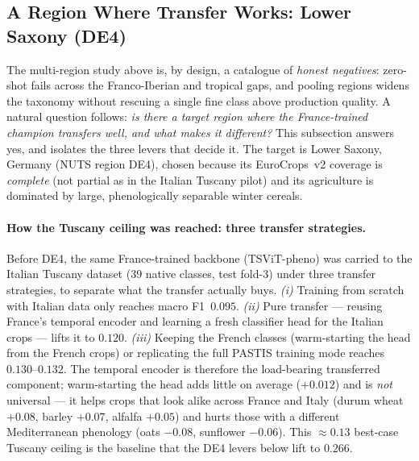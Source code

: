 
\subsection{A Region Where Transfer Works: Lower Saxony (DE4)}
\label{sec:de4}

The multi-region study above is, by design, a catalogue of \emph{honest negatives}:
zero-shot fails across the Franco-Iberian and tropical gaps, and pooling regions widens
the taxonomy without rescuing a single fine class above production quality. A natural
question follows: \emph{is there a target region where the France-trained champion transfers
well, and what makes it different?} This subsection answers yes, and isolates the three
levers that decide it. The target is Lower Saxony, Germany (NUTS region DE4), chosen because
its EuroCrops~v2 coverage is \emph{complete} (not partial as in the Italian Tuscany pilot)
and its agriculture is dominated by large, phenologically separable winter cereals.

\paragraph{How the Tuscany ceiling was reached: three transfer strategies.}
Before DE4, the same France-trained backbone (TSViT-pheno) was carried to the Italian
Tuscany dataset ($39$ native classes, test fold-3) under three transfer strategies, to
separate what the transfer actually buys. \emph{(i)} Training from scratch with Italian
data only reaches macro F1~$0.095$. \emph{(ii)} Pure transfer --- reusing France's temporal
encoder and learning a fresh classifier head for the Italian crops --- lifts it to $0.120$.
\emph{(iii)} Keeping the French classes (warm-starting the head from the French crops) or
replicating the full PASTIS training mode reaches $0.130$--$0.132$. The temporal encoder is
therefore the load-bearing transferred component; warm-starting the head adds little on
average ($+0.012$) and is \emph{not} universal --- it helps crops that look alike across
France and Italy (durum wheat $+0.08$, barley $+0.07$, alfalfa $+0.05$) and hurts those with
a different Mediterranean phenology (oats $-0.08$, sunflower $-0.06$). This $\approx0.13$
best-case Tuscany ceiling is the baseline that the DE4 levers below lift to $0.266$.

